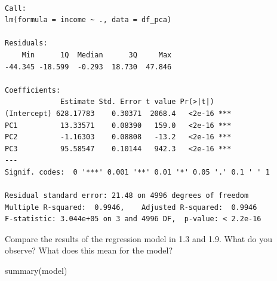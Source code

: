 \documentclass[
  letterpaper,
  DIV=11,
  numbers=noendperiod]{scrartcl}
\newenvironment{Shaded}{\begin{snugshade}}{\end{snugshade}}
\newcommand{\AttributeTok}[1]{\textcolor[rgb]{0.40,0.45,0.13}{#1}}
\newcommand{\DecValTok}[1]{\textcolor[rgb]{0.68,0.00,0.00}{#1}}
\newcommand{\FunctionTok}[1]{\textcolor[rgb]{0.28,0.35,0.67}{#1}}
\newcommand{\NormalTok}[1]{\textcolor[rgb]{0.00,0.23,0.31}{#1}}
\newcommand{\OtherTok}[1]{\textcolor[rgb]{0.00,0.23,0.31}{#1}}
\newcommand{\SpecialCharTok}[1]{\textcolor[rgb]{0.37,0.37,0.37}{#1}}
\newcommand{\StringTok}[1]{\textcolor[rgb]{0.13,0.47,0.30}{#1}}
\begin{document}
\begin{Shaded}
\end{Shaded}

\begin{verbatim}

Call:
lm(formula = income ~ ., data = df_pca)

Residuals:
    Min      1Q  Median      3Q     Max 
-44.345 -18.599  -0.293  18.730  47.846 

Coefficients:
             Estimate Std. Error t value Pr(>|t|)    
(Intercept) 628.17783    0.30371  2068.4   <2e-16 ***
PC1          13.33571    0.08390   159.0   <2e-16 ***
PC2          -1.16303    0.08808   -13.2   <2e-16 ***
PC3          95.58547    0.10144   942.3   <2e-16 ***
---
Signif. codes:  0 '***' 0.001 '**' 0.01 '*' 0.05 '.' 0.1 ' ' 1

Residual standard error: 21.48 on 4996 degrees of freedom
Multiple R-squared:  0.9946,    Adjusted R-squared:  0.9946 
F-statistic: 3.044e+05 on 3 and 4996 DF,  p-value: < 2.2e-16
\end{verbatim}

Compare the results of the regression model in 1.3 and 1.9. What do you
observe? What does this mean for the model?

\begin{Shaded}
\begin{Highlighting}[]
\FunctionTok{summary}\NormalTok{(model)  }
\end{Highlighting}
\end{Shaded}
\end{document}
